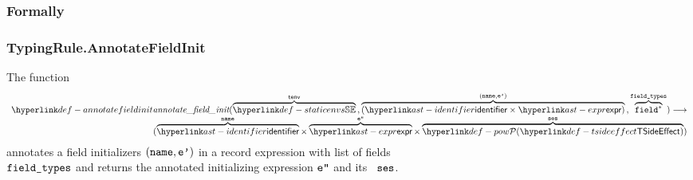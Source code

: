 \subsubsection{Formally}
\begin{mathpar}
\end{mathpar}

\hypertarget{def-annotatefieldinit}{}
\subsubsection{TypingRule.AnnotateFieldInit}
The function
\[
\begin{array}{r}
  \annotatefieldinit(
    \overname{\staticenvs}{\tenv} \aslsep
    \overname{(\identifier\times\expr)}{(\name, \vep)} \aslsep
    \overname{\field^*}{\fieldtypes}
  ) \aslto \\
  (\overname{\identifier}{\name} \times \overname{\expr}{\vepp} \times \overname{\TSideEffectSet}{\vses})
\end{array}
\]
annotates a field initializers $(\name, \vep)$ in a record expression
with list of fields \\ $\fieldtypes$ and returns the annotated initializing expression $\vepp$
and its \sideeffectdescriptorterm\ $\vses$. \ProseOtherwiseTypeError


